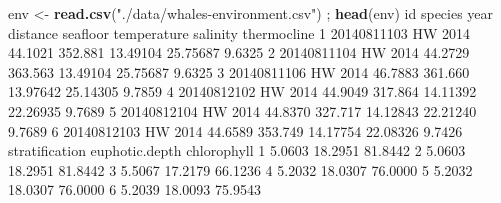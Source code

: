 \documentclass[]{book}
\newenvironment{Shaded}{\begin{snugshade}}{\end{snugshade}}
\newcommand{\DecValTok}[1]{\textcolor[rgb]{0.00,0.00,0.81}{#1}}
\newcommand{\FloatTok}[1]{\textcolor[rgb]{0.00,0.00,0.81}{#1}}
\newcommand{\KeywordTok}[1]{\textcolor[rgb]{0.13,0.29,0.53}{\textbf{#1}}}
\newcommand{\NormalTok}[1]{#1}
\newcommand{\StringTok}[1]{\textcolor[rgb]{0.31,0.60,0.02}{#1}}
\begin{document}
\begin{Shaded}
\begin{Highlighting}[]
\NormalTok{env <-}\StringTok{ }\KeywordTok{read.csv}\NormalTok{(}\StringTok{"./data/whales-environment.csv"}\NormalTok{) ; }\KeywordTok{head}\NormalTok{(env)}
\NormalTok{           id species year distance seafloor temperature salinity thermocline}
\DecValTok{1} \DecValTok{20140811103}\NormalTok{      HW }\DecValTok{2014}  \FloatTok{44.1021}  \FloatTok{352.881}    \FloatTok{13.49104} \FloatTok{25.75687}      \FloatTok{9.6325}
\DecValTok{2} \DecValTok{20140811104}\NormalTok{      HW }\DecValTok{2014}  \FloatTok{44.2729}  \FloatTok{363.563}    \FloatTok{13.49104} \FloatTok{25.75687}      \FloatTok{9.6325}
\DecValTok{3} \DecValTok{20140811106}\NormalTok{      HW }\DecValTok{2014}  \FloatTok{46.7883}  \FloatTok{361.660}    \FloatTok{13.97642} \FloatTok{25.14305}      \FloatTok{9.7859}
\DecValTok{4} \DecValTok{20140812102}\NormalTok{      HW }\DecValTok{2014}  \FloatTok{44.9049}  \FloatTok{317.864}    \FloatTok{14.11392} \FloatTok{22.26935}      \FloatTok{9.7689}
\DecValTok{5} \DecValTok{20140812104}\NormalTok{      HW }\DecValTok{2014}  \FloatTok{44.8370}  \FloatTok{327.717}    \FloatTok{14.12843} \FloatTok{22.21240}      \FloatTok{9.7689}
\DecValTok{6} \DecValTok{20140812103}\NormalTok{      HW }\DecValTok{2014}  \FloatTok{44.6589}  \FloatTok{353.749}    \FloatTok{14.17754} \FloatTok{22.08326}      \FloatTok{9.7426}
\NormalTok{  stratification euphotic.depth chlorophyll}
\DecValTok{1}         \FloatTok{5.0603}        \FloatTok{18.2951}     \FloatTok{81.8442}
\DecValTok{2}         \FloatTok{5.0603}        \FloatTok{18.2951}     \FloatTok{81.8442}
\DecValTok{3}         \FloatTok{5.5067}        \FloatTok{17.2179}     \FloatTok{66.1236}
\DecValTok{4}         \FloatTok{5.2032}        \FloatTok{18.0307}     \FloatTok{76.0000}
\DecValTok{5}         \FloatTok{5.2032}        \FloatTok{18.0307}     \FloatTok{76.0000}
\DecValTok{6}         \FloatTok{5.2039}        \FloatTok{18.0093}     \FloatTok{75.9543}


\end{Highlighting}
\end{Shaded}
\end{document}

